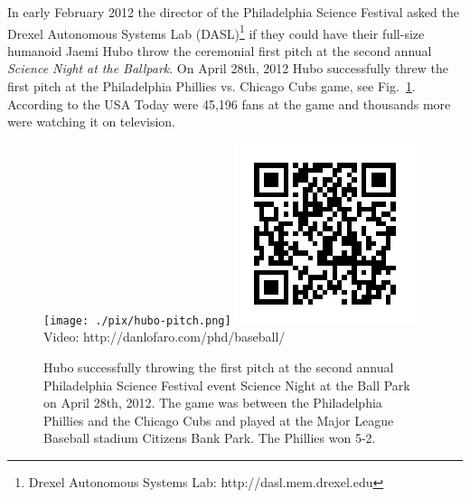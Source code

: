 











In early February 2012 the director of the Philadelphia Science Festival asked the Drexel Autonomous Systems Lab (DASL)\footnote{Drexel Autonomous Systems Lab: http://dasl.mem.drexel.edu}\label{foot:dasl} if they could have their full-size humanoid Jaemi Hubo throw the ceremonial first pitch at the second annual \textit{Science Night at the Ballpark}.  
On April 28th, 2012 Hubo successfully threw the first pitch at the Philadelphia Phillies vs. Chicago Cubs game, see Fig.~\ref{fig:hubo-throw}.  According to the USA Today were 45,196 fans at the game and thousands
more were watching it on television.

\begin{figure}[t]
  \centering
\texttt{[image: ./pix/hubo-pitch.png]}
\includegraphics[width=0.3\columnwidth]{./qrcode/qrcode-baseball.png}\\
      Video: http://danlofaro.com/phd/baseball/
      
  \caption{Hubo successfully throwing the first pitch at the second annual Philadelphia Science Festival event Science Night at the Ball Park on April 28th, 2012.  The game was between the Philadelphia Phillies and the Chicago Cubs and played at the Major League Baseball stadium Citizens Bank Park.  The Phillies won 5-2.}
  \label{fig:hubo-throw}
\end{figure}



